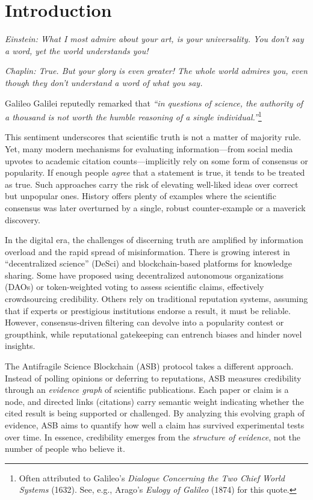 \section{Introduction}

\emph{Einstein: What I most admire about your art, is your universality. You don’t say a word, yet the world understands you!}

\emph{Chaplin: True. But your glory is even greater! The whole world admires you, even though they don’t understand a word of what you say.}

Galileo Galilei reputedly remarked that \emph{``in questions of science, the authority of a thousand is not worth the humble reasoning of a single individual.''}\footnote{Often attributed to Galileo's \emph{Dialogue Concerning the Two Chief World Systems} (1632). See, e.g., Arago's \emph{Eulogy of Galileo} (1874) for this quote.} 

This sentiment underscores that scientific truth is not a matter of majority rule. Yet, many modern mechanisms for evaluating information---from social media upvotes to academic citation counts---implicitly rely on some form of consensus or popularity. If enough people \emph{agree} that a statement is true, it tends to be treated as true. Such approaches carry the risk of elevating well-liked ideas over correct but unpopular ones. History offers plenty of examples where the scientific consensus was later overturned by a single, robust counter-example or a maverick discovery.

In the digital era, the challenges of discerning truth are amplified by information overload and the rapid spread of misinformation. There is growing interest in ``decentralized science'' (DeSci) and blockchain-based platforms for knowledge sharing. Some have proposed using decentralized autonomous organizations (DAOs) or token-weighted voting to assess scientific claims, effectively crowdsourcing credibility. Others rely on traditional reputation systems, assuming that if experts or prestigious institutions endorse a result, it must be reliable. However, consensus-driven filtering can devolve into a popularity contest or groupthink, while reputational gatekeeping can entrench biases and hinder novel insights.

The Antifragile Science Blockchain (ASB) protocol takes a different approach. Instead of polling opinions or deferring to reputations, ASB measures credibility through an \emph{evidence graph} of scientific publications. Each paper or claim is a node, and directed links (citations) carry semantic weight indicating whether the cited result is being supported or challenged. By analyzing this evolving graph of evidence, ASB aims to quantify how well a claim has survived experimental tests over time. In essence, credibility emerges from the \emph{structure of evidence}, not the number of people who believe it.

